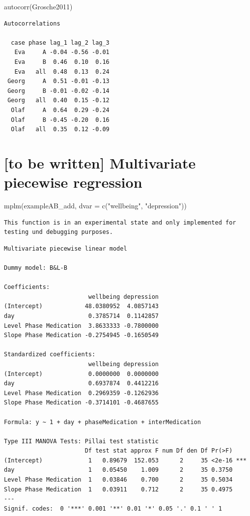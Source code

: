 \documentclass[
]{book}
\newenvironment{Shaded}{\begin{snugshade}}{\end{snugshade}}
\newcommand{\AttributeTok}[1]{\textcolor[rgb]{0.77,0.63,0.00}{#1}}
\newcommand{\FunctionTok}[1]{\textcolor[rgb]{0.00,0.00,0.00}{#1}}
\newcommand{\NormalTok}[1]{#1}
\newcommand{\StringTok}[1]{\textcolor[rgb]{0.31,0.60,0.02}{#1}}
\begin{document}
\begin{Shaded}
\begin{Highlighting}[]
\FunctionTok{autocorr}\NormalTok{(Grosche2011)}
\end{Highlighting}
\end{Shaded}

\begin{verbatim}
Autocorrelations

  case phase lag_1 lag_2 lag_3
   Eva     A -0.04 -0.56 -0.01
   Eva     B  0.46  0.10  0.16
   Eva   all  0.48  0.13  0.24
 Georg     A  0.51 -0.01 -0.13
 Georg     B -0.01 -0.02 -0.14
 Georg   all  0.40  0.15 -0.12
  Olaf     A  0.64  0.29 -0.24
  Olaf     B -0.45 -0.20  0.16
  Olaf   all  0.35  0.12 -0.09
\end{verbatim}

\hypertarget{to-be-written-multivariate-piecewise-regression}{%
\section{{[}to be written{]} Multivariate piecewise regression}\label{to-be-written-multivariate-piecewise-regression}}

\begin{Shaded}
\begin{Highlighting}[]
\FunctionTok{mplm}\NormalTok{(exampleAB\_add, }\AttributeTok{dvar =} \FunctionTok{c}\NormalTok{(}\StringTok{"wellbeing"}\NormalTok{, }\StringTok{"depression"}\NormalTok{))}
\end{Highlighting}
\end{Shaded}

\begin{verbatim}
This function is in an experimental state and only implemented for testing und debugging purposes.
\end{verbatim}

\begin{verbatim}
Multivariate piecewise linear model

Dummy model: B&L-B 

Coefficients: 
                        wellbeing depression
(Intercept)            48.0380952  4.0857143
day                     0.3785714  0.1142857
Level Phase Medication  3.8633333 -0.7800000
Slope Phase Medication -0.2754945 -0.1650549

Standardized coefficients: 
                        wellbeing depression
(Intercept)             0.0000000  0.0000000
day                     0.6937874  0.4412216
Level Phase Medication  0.2969359 -0.1262936
Slope Phase Medication -0.3714101 -0.4687655

Formula: y ~ 1 + day + phaseMedication + interMedication

Type III MANOVA Tests: Pillai test statistic
                       Df test stat approx F num Df den Df Pr(>F)    
(Intercept)             1   0.89679  152.053      2     35 <2e-16 ***
day                     1   0.05450    1.009      2     35 0.3750    
Level Phase Medication  1   0.03846    0.700      2     35 0.5034    
Slope Phase Medication  1   0.03911    0.712      2     35 0.4975    
---
Signif. codes:  0 '***' 0.001 '**' 0.01 '*' 0.05 '.' 0.1 ' ' 1
\end{verbatim}
\end{document}
